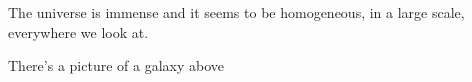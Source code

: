 \documentclass{article}
\begin{document}
The universe is immense and it seems to be homogeneous, 
in a large scale, everywhere we look at.
 

 
There's a picture of a galaxy above
\end{document}
